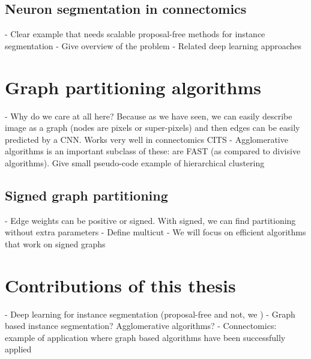 \subsection{Neuron segmentation in connectomics}
- Clear example that needs scalable proposal-free methods for instance segmentation
- Give overview of the problem
- Related deep learning approaches

\section{Graph partitioning algorithms}
- Why do we care at all here? Because as we have seen, we can easily describe image as a graph (nodes are pixels or super-pixels) and then edges can be easily predicted by a CNN. Works very well in connectomics CITS
- Agglomerative algorithms is an important subclass of these: are FAST (as compared to divisive algorithms). Give small pseudo-code example of hierarchical clustering

\subsection{Signed graph partitioning}
- Edge weights can be positive or signed. With signed, we can find partitioning without extra parameters
- Define multicut
- We will focus on efficient algorithms that work on signed graphs


\section{Contributions of this thesis}






- Deep learning for instance segmentation (proposal-free and not, we )
- Graph based instance segmentation? Agglomerative algorithms?
- Connectomics: example of application where graph based algorithms have been successfully applied


